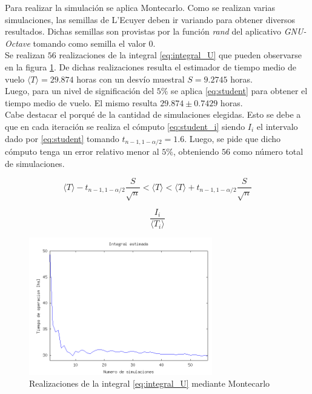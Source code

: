 \documentclass{sig-alternate}
\begin{document}
Para realizar la simulaci\'on se aplica Montecarlo. Como se realizan varias
simulaciones, las semillas de L'Ecuyer deben ir variando para obtener diversos
resultados. Dichas semillas son provistas por la funci\'on \textit{rand} del
aplicativo \textit{GNU-Octave} tomando como semilla el valor 0. \\
Se realizan $56$ realizaciones de la integral \eqref{eq:integral_U} que pueden
observarse en la figura \ref{fig:montecarlo}. De dichas realizaciones resulta
el estimador de tiempo medio de vuelo $\langle T \rangle = 29.874$ horas con
un desv\'io muestral $S = 9.2745$ horas. \\
Luego, para un nivel de significaci\'on del $5\%$ se aplica
\eqref{eq:student} para obtener el tiempo medio de vuelo. El mismo
resulta $ 29.874 \pm 0.7429 $ horas.\\
Cabe destacar el porqu\'e de la cantidad de simulaciones elegidas. Esto
se debe a que en cada iteraci\'on se realiza el c\'omputo
\eqref{eq:student_i} siendo $I_i$ el intervalo dado por \eqref{eq:student}
tomando  $t_{n-1,1-\alpha/2}=1.6$.
Luego, se pide que dicho c\'omputo tenga un error relativo menor al $5\%$,
obteniendo $56$ como n\'umero total de simulaciones.

\begin{equation}
\label{eq:student}
\langle T \rangle - t_{n-1,1-\alpha/2}\frac{S}{\sqrt{n}}
< \langle T \rangle <
\langle T \rangle + t_{n-1,1-\alpha/2}\frac{S}{\sqrt{n}}
\end{equation}

\begin{equation}
\label{eq:student_i}
\frac{I_i}{\langle T_i \rangle}
\end{equation}


\begin{figure}[ht]
\label{fig:montecarlo}
\includegraphics[width=8cm]{mean}
\caption{Realizaciones de la integral \ref{eq:integral_U} mediante Montecarlo}
\end{figure}
\end{document}
